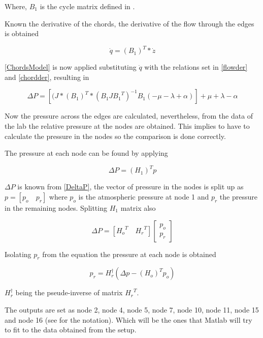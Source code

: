 Where, $B_1$ is the cycle matrix defined in . 

Known the derivative of the chords, the derivative of the flow through the edges is obtained

\begin{equation}
  \dot{q}  = (B_1)^T * \dot{z}
  \label{flowder}
\end{equation}

\eqref{ChordsModel} is now applied substituting $\dot{q}$ with the relations set in \eqref{flowder} and \eqref{chordder}, resulting in

\begin{equation}
  \Delta P = [(J*(B_1)^T * (B_1 J {B_1}^T)^{-1}B_1 (-\mu - \lambda + \alpha)]+\mu+\lambda-\alpha
  \label{DeltaP}
\end{equation}

Now the pressure across the edges are calculated, nevertheless, from the data of the lab the relative pressure at the nodes are obtained. This implies to 
have to calculate the pressure in the nodes so the comparison is done correctly. 

The pressure at each node can be found by applying 

\begin{equation}
  \Delta P = (H_1)^T p
\end{equation}

$\Delta P$ is known from \eqref{DeltaP}, the vector of pressure in the nodes is split up as $p = [p_o \quad p_r]$ where $p_o$ is the atmospheric pressure at 
node 1 and $p_r$ the pressure in the remaining nodes. Splitting $H_1$ matrix also

\begin{equation}
  \Delta P = [{H_o}^{T} \quad {H_r}^{T}] 
  \begin{bmatrix}
    p_o \\
    p_r
  \end{bmatrix}
\end{equation}

Isolating $p_r$ from the equation the pressure at each node is obtained

\begin{equation}
  p_r = H_r^{\dagger} (\Delta p - (H_o)^{T} p_o)
\end{equation}

$H_r^{\dagger}$ being the pseude-inverse of matrix ${H_r}^{T}$.

The outputs are set as node 2, node 4, node 5, node 7, node 10, node 11, node 15 and node 16 (see  for the notation). Which will be the ones that Matlab will try to fit 
to the data obtained from the setup. 


